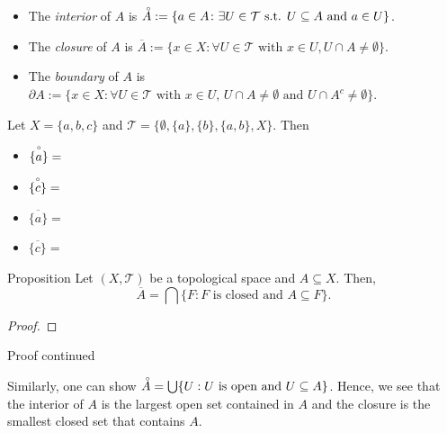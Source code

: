 \documentclass [aspectratio=169]{beamer}
\newcommand{\cT}{\mathcal{T}}
\newcommand{\interior}{\accentset{\circ}}
\begin{document}
\begin{frame}
\begin{itemize}
    \item The \emph{interior} of $A$ is $\interior A := \{a \in A \colon \exists U \in  \cT \text{ s.t. } U\subseteq A \text{ and } a\in U\} $.
    \item The \emph{closure} of $A$ is $\overline{A} := \{x \in X \colon \forall U \in \cT \text{ with } x \in U, U\cap A \neq \emptyset\}$.
    \item The \emph{boundary} of $A$ is $\partial A:= \{x \in X \colon \forall U\in \cT \text{ with } x\in U, \, U \cap A \neq \emptyset \text{ and } U \cap A^c \neq \emptyset \}$.
\end{itemize}

\vspace{1em}

\begin{example}
Let $X=\{a,b,c\}$ and $\cT = \{\emptyset ,\{a\}, \{b\},\{a,b\}, X\}$. Then 
\begin{itemize}
    \item $ \interior{\{ a\} } =$
    \item $\interior{ \{c\}} =$
    \item $\overline{\{a\}}=$
    \item $\overline{\{c\}} =$
\end{itemize}
\end{example}
\end{frame}

\begin{frame}
\begin{exampleblock}{Proposition}
 Let $(X,\cT)$ be a topological space and $A\subseteq X$. Then,
 \begin{equation*}
     \overline{A} = \bigcap \{F \colon F \text{ is closed and } A \subseteq F\}.
 \end{equation*}
\end{exampleblock}
\begin{proof}
\vspace{3cm}
\end{proof}
\end{frame}


\begin{frame}
\begin{block}{Proof continued}
\vspace{4.5cm}
\end{block}
Similarly, one can show $\interior A =\bigcup \{U: U \text{ is open and } U \subseteq A \}$. Hence, we see that the interior of $A$ is the largest open set contained in $A$ and the closure is the smallest closed set that contains $A$.

\end{frame}
\end{document}
